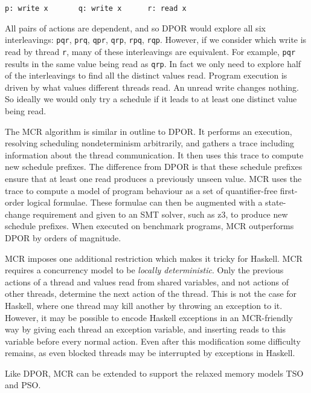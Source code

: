 \begin{center}
\verb|p: write x       q: write x      r: read x|
\end{center}

All pairs of actions are dependent, and so DPOR would explore all six
interleavings: \texttt{pqr}, \texttt{prq}, \texttt{qpr}, \texttt{qrp},
\texttt{rpq}, \texttt{rqp}.  However, if we consider which write is
read by thread \texttt{r}, many of these interleavings are equivalent.
For example, \texttt{pqr} results in the same value being read as
\texttt{qrp}.  In fact we only need to explore half of the
interleavings to find all the distinct values read.  Program execution
is driven by what values different threads read.  An unread write
changes nothing.  So ideally we would only try a schedule if it leads
to at least one distinct value being read.

The MCR algorithm is similar in outline to DPOR\@.  It performs an
execution, resolving scheduling nondeterminism arbitrarily, and
gathers a trace including information about the thread communication.
It then uses this trace to compute new schedule prefixes.  The
difference from DPOR is that these schedule prefixes ensure that at
least one read produces a previously unseen value.  MCR uses the trace
to compute a model of program behaviour as a set of quantifier-free
first-order logical formulae.  These formulae can then be augmented
with a state-change requirement and given to an SMT
solver\cite{demoura2011}, such as z3\cite{demoura2008}, to produce new
schedule prefixes.  When executed on benchmark programs, MCR
outperforms DPOR by orders of magnitude\cite{huang2017}.

MCR imposes one additional restriction which makes it tricky for
Haskell.  MCR requires a concurrency model to be \emph{locally
  deterministic}\cite{huang2015}.  Only the previous actions of a
thread and values read from shared variables, and not actions of other
threads, determine the next action of the thread.  This is not the
case for Haskell, where one thread may kill another by throwing an
exception to it.  However, it may be possible to encode Haskell
exceptions in an MCR-friendly way by giving each thread an exception
variable, and inserting reads to this variable before every normal
action.  Even after this modification some difficulty remains, as even
blocked threads may be interrupted by exceptions in Haskell.

Like DPOR, MCR can be extended to support the relaxed memory models TSO and
PSO\cite{huang2016}.

